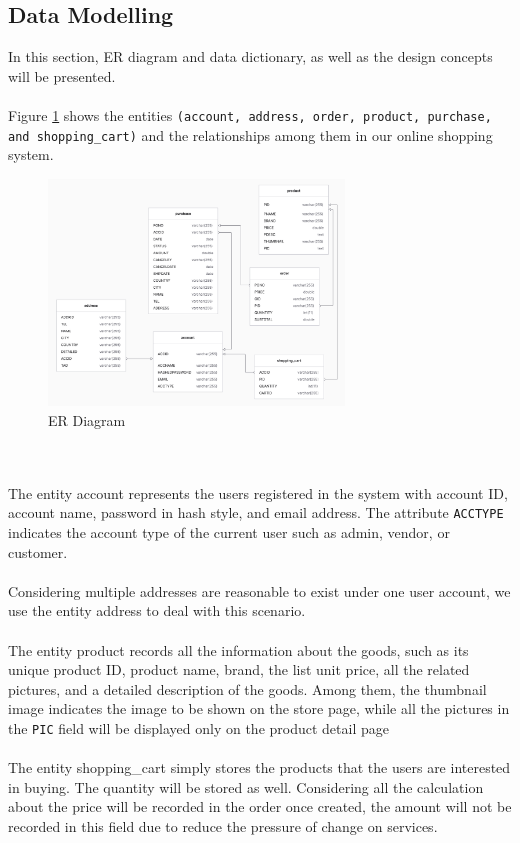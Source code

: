 \documentclass{article}
\begin{document}
\subsection{Data Modelling}
In this section, ER diagram and data dictionary, as well as the design concepts will be presented. 
\\\\
Figure \ref{fig:ER Diagram} shows the entities \verb|(account, address, order, product, purchase, and shopping_cart)| and the relationships among them in our online shopping system.
\begin{figure}[!htp]
    \centering
    \includegraphics[width=0.7\textwidth]{ER Diagram.png}
    \caption{\label{fig:ER Diagram}ER Diagram}
\end{figure}
\\\\
The entity account represents the users registered in the system with account ID, account name, password in hash style, and email address. The attribute \verb|ACCTYPE| indicates the account type of the current user such as admin, vendor, or customer. 
\\\\
Considering multiple addresses are reasonable to exist under one user account, we use the entity address to deal with this scenario.
\\\\
The entity product records all the information about the goods, such as its unique product ID, product name, brand, the list unit price, all the related pictures, and a detailed description of the goods. Among them, the thumbnail image indicates the image to be shown on the store page, while all the pictures in the \verb|PIC| field will be displayed only on the product detail page
\\\\
The entity shopping\_cart simply stores the products that the users are interested in buying. The quantity will be stored as well. Considering all the calculation about the price will be recorded in the order once created, the amount will not be recorded in this field due to reduce the pressure of change on services.
\end{document}
